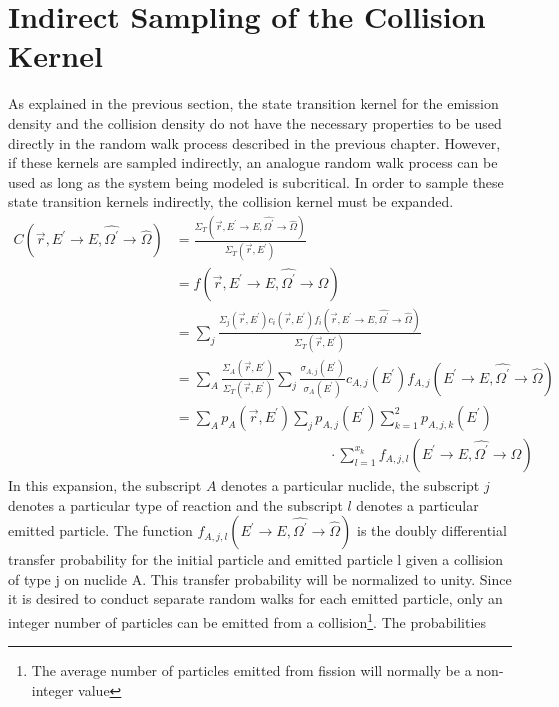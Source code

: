 \section{Indirect Sampling of the Collision Kernel}
As explained in the previous section, the state transition kernel for the 
emission density and the collision density do not have the necessary properties
to be used directly in the random walk process described in the previous 
chapter. However, if these kernels are sampled indirectly, an analogue random 
walk process can be used as long as the system being modeled is subcritical. In 
order to sample these state transition kernels indirectly, the collision kernel 
must be expanded. 
\begin{align}
  C(\vec{r},E^{'} \to E, \hat{\Omega^{'}} \to \hat{\Omega}) & =
  \frac{\Sigma_T(\vec{r},E^{'} \to E,\hat{\Omega^{'}} \to \hat{\Omega})}
       {\Sigma_T(\vec{r},E^{'})} \nonumber \\
  & = f(\vec{r},E^{'} \to E,\hat{\Omega^{'}} \to \hat{\Omega}) \nonumber \\
  & = \sum_j \frac{\Sigma_j(\vec{r},E^{'})c_i(\vec{r},E^{'})
            f_i(\vec{r},E^{'} \to E,\hat{\Omega^{'}} \to \hat{\Omega})}
           {\Sigma_T(\vec{r},E^{'})} \nonumber \\
  & = \sum_A \frac{\Sigma_A(\vec{r},E^{'})}{\Sigma_T(\vec{r},E^{'})}
      \sum_j \frac{\sigma_{A,j}(E^{'})}{\sigma_A(E^{'})} c_{A,j}(E^{'})
      f_{A,j}(E^{'} \to E,\hat{\Omega^{'}} \to \hat{\Omega}) \nonumber \\
  & = \sum_A p_A(\vec{r},E^{'}) \sum_j p_{A,j}(E^{'}) 
      \sum_{k=1}^2 p_{A,j,k}(E^{'}) \nonumber \\
  & \qquad \qquad \qquad \qquad \qquad \quad
      \cdot \sum_{l=1}^{x_k} 
      f_{A,j,l}(E^{'} \to E,\hat{\Omega^{'}} \to \hat{\Omega})
  \label{eq:fully_expanded_collision_kernel}
\end{align}
In this expansion, the subscript $A$ denotes a particular nuclide, the subscript
$j$ denotes a particular type of reaction and the subscript $l$ denotes a 
particular emitted particle. The function 
$f_{A,j,l}(E^{'} \to E,\hat{\Omega^{'}} \to \hat{\Omega})$ is the doubly
differential transfer probability for the initial particle and emitted
particle l given a collision of type j on nuclide A. This transfer probability
will be normalized to unity. Since it is desired to conduct separate random
walks for each emitted particle, only an integer number of particles 
can be emitted from a collision\footnote{The average number of particles emitted
from fission will normally be a non-integer value}. The probabilities 
